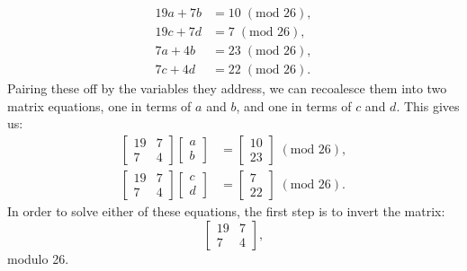 \documentclass{article}
\begin{document}
\begin{align*}
    19a + 7b &= 10 \; (\text{mod } 26), \\
    19c + 7d &= 7 \; (\text{mod } 26), \\
    7a + 4b &= 23 \; (\text{mod } 26), \\
    7c + 4d &= 22 \; (\text{mod } 26).
\end{align*}
Pairing these off by the variables they address, we can recoalesce them into two matrix equations, one in terms of $a$ and $b$, and one in terms of $c$ and $d$. This gives us:
\begin{align*}
    \begin{bmatrix}
        19 & 7 \\
        7 & 4
    \end{bmatrix} \begin{bmatrix}
        a \\
        b
    \end{bmatrix} &= \begin{bmatrix}
        10 \\
        23
    \end{bmatrix} \; (\text{mod } 26), \\
    \begin{bmatrix}
        19 & 7 \\
        7 & 4
    \end{bmatrix} \begin{bmatrix}
        c \\
        d
    \end{bmatrix} &= \begin{bmatrix}
        7 \\
        22
    \end{bmatrix} \; (\text{mod } 26).
\end{align*}
In order to solve either of these equations, the first step is to invert the matrix:
\[
    \begin{bmatrix}
        19 & 7 \\
        7 & 4
    \end{bmatrix},
\]
modulo 26. \medskip
\end{document}
